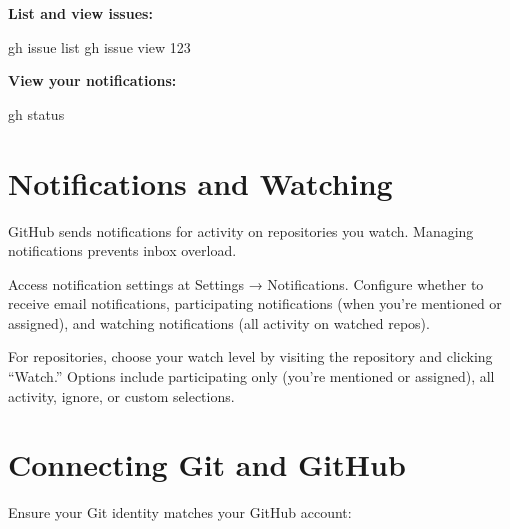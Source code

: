 \documentclass[
  letterpaper,
  DIV=11,
  numbers=noendperiod]{scrreprt}
\newenvironment{Shaded}{\begin{snugshade}}{\end{snugshade}}
\newcommand{\ExtensionTok}[1]{\textcolor[rgb]{0.00,0.23,0.31}{#1}}
\newcommand{\NormalTok}[1]{\textcolor[rgb]{0.00,0.23,0.31}{#1}}
\begin{document}
\textbf{List and view issues:}

\begin{codelisting}

\caption{\texttt{terminal}}

\begin{Shaded}
\begin{Highlighting}[]
\ExtensionTok{gh}\NormalTok{ issue list}
\ExtensionTok{gh}\NormalTok{ issue view 123}
\end{Highlighting}
\end{Shaded}

\end{codelisting}

\textbf{View your notifications:}

\begin{codelisting}

\caption{\texttt{terminal}}

\begin{Shaded}
\begin{Highlighting}[]
\ExtensionTok{gh}\NormalTok{ status}
\end{Highlighting}
\end{Shaded}

\end{codelisting}

\section{Notifications and Watching}\label{notifications-and-watching}

GitHub sends notifications for activity on repositories you watch.
Managing notifications prevents inbox overload.

Access notification settings at Settings → Notifications. Configure
whether to receive email notifications, participating notifications
(when you're mentioned or assigned), and watching notifications (all
activity on watched repos).

For repositories, choose your watch level by visiting the repository and
clicking ``Watch.'' Options include participating only (you're mentioned
or assigned), all activity, ignore, or custom selections.

\section{Connecting Git and GitHub}\label{connecting-git-and-github}

Ensure your Git identity matches your GitHub account:
\end{document}
